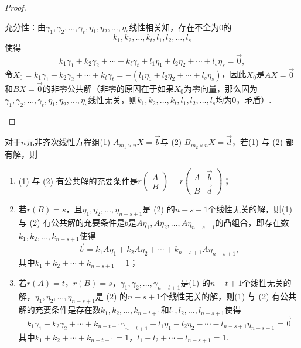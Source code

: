 \begin{proof}
\begin{enumerate}
        充分性：由$\gamma_1,\gamma_2,\ldots,\gamma_t,\eta_1,\eta_2,\ldots,\eta_s$线性相关知，存在不全为0的
        \[k_1,k_2,\ldots,k_t,l_1,l_2,\ldots,l_s\]
        使得
        \[k_1\gamma_1+k_2\gamma_2+\cdots+k_t\gamma_t+l_1\eta_1+l_2\eta_2+\cdots+l_s\eta_s=\vec{0},\]
        令$X_0=k_1\gamma_1+k_2\gamma_2+\cdots+k_t\gamma_t=-(l_1\eta_1+l_2\eta_2+\cdots+l_s\eta_s)$，因此$X_0$是$AX=\vec{0}$和$BX=\vec{0}$的非零公共解（非零的原因在于如果$X_0$为零向量，那么因为$\gamma_1,\gamma_2,\ldots,\gamma_t,\eta_1,\eta_2,\ldots,\eta_s$线性无关，则$k_1,k_2,\ldots,k_t,l_1,l_2,\ldots,l_s$均为0，矛盾）.
    \end{enumerate}
\end{proof}

\begin{theorem}\label{thm:15:非齐次线性方程组公共解}
    对于$n$元非齐次线性方程组(1) $A_{m_1 \times n}X=\vec{b}$与 (2) $B_{m_2 \times n}X=\vec{d}$，若(1) 与 (2) 都有解，则
    \begin{enumerate}
        \item (1) 与 (2) 有公共解的充要条件是$r\begin{pmatrix}
                      A \\ B
                  \end{pmatrix}=r\begin{pmatrix}
                      A & \vec{b} \\ B & \vec{d}
                  \end{pmatrix}$；

        \item 若$r(B)=s$，且$\eta_1,\eta_2,\ldots,\eta_{n-s+1}$是 (2) 的$n-s+1$个线性无关的解，则(1) 与 (2) 有公共解的充要条件是$b$是$A\eta_1,A\eta_2,\ldots,A\eta_{n-s+1}$的凸组合，即存在数$k_1,k_2,\ldots,k_{n-s+1}$使得
              \[\vec{b}=k_1A\eta_1+k_2A\eta_2+\cdots+k_{n-s+1}A\eta_{n-s+1},\]
              其中$k_1+k_2+\cdots+k_{n-s+1}=1$；

        \item 若$r(A)=t$，$r(B)=s$，$\gamma_1,\gamma_2,\ldots,\gamma_{n-t+1}$是(1) 的$n-t+1$个线性无关的解，$\eta_1,\eta_2,\ldots,\eta_{n-s+1}$是 (2) 的$n-s+1$个线性无关的解，则(1) 与 (2) 有公共解的充要条件是存在数$k_1,k_2,\ldots,k_{n-t+1}$和$l_1,l_2,\ldots,l_{n-s+1}$使得
              \[k_1\gamma_1+k_2\gamma_2+\cdots+k_{n-t+1}\gamma_{n-t+1}-l_1\eta_1-l_2\eta_2-\cdots-l_{n-s+1}\eta_{n-s+1}=\vec{0}\]
              其中$k_1+k_2+\cdots+k_{n-t+1}=1$，$l_1+l_2+\cdots+l_{n-s+1}=1$.
    \end{enumerate}
\end{theorem}

